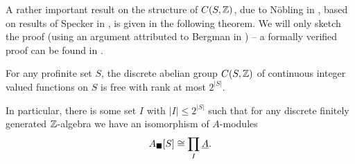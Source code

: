 A rather important result on the structure of ${C(S, {\mathbb{Z}})}$, due to Nöbling in \cite{noebling}, based on results of Specker in \cite{specker}, is given in the following theorem. We will only sketch the proof (using an argument attributed to Bergman in \cite[Thm. 97.2]{fuchs-infinite-abelian-groups}) -- a formally verified proof can be found in \cite{asgeirsson}.
\begin{theorem}
	\label{theorem: specker's theorem}
	
	For any profinite set $S$, the discrete abelian group ${C(S, {\mathbb{Z}})}$ of continuous integer valued functions on $S$ is free with rank at most $2^{\vert S\vert}$.
	
	In particular, there is some set $I$ with $\vert I\vert\le 2^{\vert S\vert}$ such that for any discrete finitely generated ${\mathbb{Z}}$-algebra we have an isomorphism of $A$-modules
		$${A_\blacksquare[S]} \cong \prod_I \underline{A}.$$
\end{theorem}
